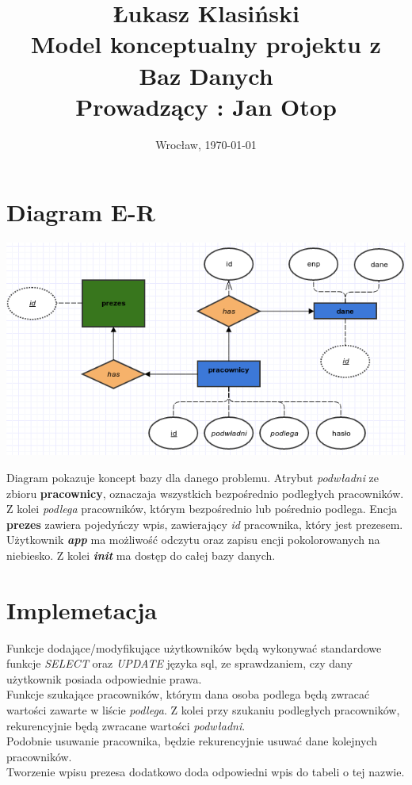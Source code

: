 \documentclass[11pt, wide]{article}
\date{Wrocław, \today}
\title{Łukasz Klasiński\\\LARGE\textbf{Model konceptualny projektu z \\Baz Danych\\}
    Prowadzący : Jan Otop}
\begin{document}
    \maketitle
    \thispagestyle{empty}
    \section{Diagram E-R }
    \includegraphics[width=\textwidth]{er}    

    Diagram pokazuje koncept bazy dla danego problemu. Atrybut \textit{podwładni}
    ze zbioru \textbf{pracownicy}, oznaczaja wszystkich bezpośrednio podległych pracowników. Z kolei
    \textit{podlega} pracowników, którym bezpośrednio lub pośrednio podlega. 
    Encja \textbf{prezes} zawiera pojedyńczy wpis, zawierający \textit{id} pracownika, który
    jest prezesem.\\

    Użytkownik \textbf{\textit{app}} ma możliwość odczytu oraz zapisu encji pokolorowanych
    na niebiesko. Z kolei \textbf{\textit{init}} ma dostęp do całej bazy danych.

    \section{Implemetacja}
    Funkcje dodające/modyfikujące użytkowników będą wykonywać standardowe
    funkcje \textit{SELECT} oraz \textit{UPDATE} języka sql, ze sprawdzaniem, czy 
    dany użytkownik posiada odpowiednie prawa.\\    
    Funkcje szukające pracowników, którym dana osoba podlega będą zwracać wartości zawarte w liście \textit{podlega}. 
    Z kolei przy szukaniu podległych pracowników, rekurencyjnie będą zwracane wartości \textit{podwładni}.
    \\Podobnie usuwanie pracownika, będzie rekurencyjnie usuwać dane kolejnych pracowników.
    \\Tworzenie wpisu prezesa dodatkowo doda odpowiedni wpis do tabeli o tej nazwie.
\end{document}
